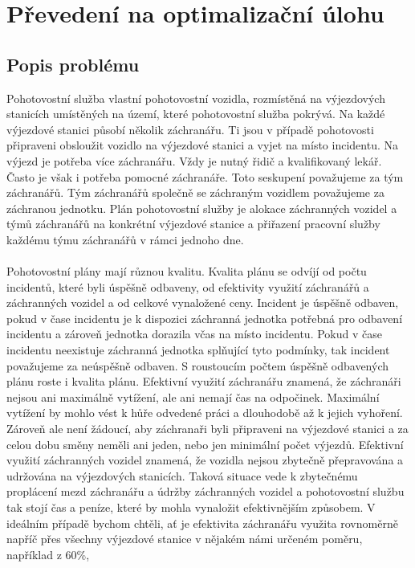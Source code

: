 \chapter{Převedení na optimalizační úlohu}

\section{Popis problému}

Pohotovostní služba vlastní pohotovostní vozidla, rozmístěná na výjezdových stanicích umístěných na území, které pohotovostní služba pokrývá.
Na každé výjezdové stanici působí několik záchranářu. Ti jsou v případě pohotovosti připraveni obsloužit vozidlo na výjezdové stanici a vyjet na místo incidentu.
Na výjezd je potřeba více záchranářu. Vždy je nutný řidič a kvalifikovaný lekář. Často je však i potřeba pomocné záchranáře.
Toto seskupení považujeme za tým záchranářů.
Tým záchranářů společně se záchraným vozidlem považujeme za záchranou jednotku.
Plán pohotovostní služby je alokace záchranných vozidel a týmů záchranářů na konkrétní výjezdové stanice a přiřazení pracovní služby každému týmu záchranářů v rámci jednoho dne.
\\\\
Pohotovostní plány mají různou kvalitu. Kvalita plánu se odvíjí od počtu incidentů, které byli úspěšně odbaveny, od efektivity využití záchranářů a záchranných vozidel a od celkové vynaložené ceny.
Incident je úspěšně odbaven, pokud v čase incidentu je k dispozici záchranná jednotka potřebná pro odbavení incidentu a zároveň jednotka dorazila včas na místo incidentu.
Pokud v čase incidentu neexistuje záchranná jednotka splňující tyto podmínky, tak incident považujeme za neúspěšně odbaven.
S roustoucím počtem úspěšně odbavených plánu roste i kvalita plánu.
Efektivní využití záchranářu znamená, že záchranáři nejsou ani maximálně vytížení, ale ani nemají čas na odpočinek.
Maximální vytížení by mohlo vést k hůře odvedené práci a dlouhodobě až k jejich vyhoření.
Zároveň ale není žádoucí, aby záchranaři byli připraveni na výjezdové stanici a za celou dobu směny neměli ani jeden, nebo jen minimální počet výjezdů.
Efektivní využití záchranných vozidel znamená, že vozidla nejsou zbytečně přepravována a udržována na výjezdových stanicích.
Taková situace vede k zbytečnému proplácení mezd záchranářu a údržby záchranných vozidel a pohotovostní službu tak stojí čas a peníze, které by mohla vynaložit efektivnějším způsobem.
V ideálním případě bychom chtěli, ať je efektivita záchranářu využita rovnoměrně napříč přes všechny výjezdové stanice v nějakém námi určeném poměru, například z 60\%,
